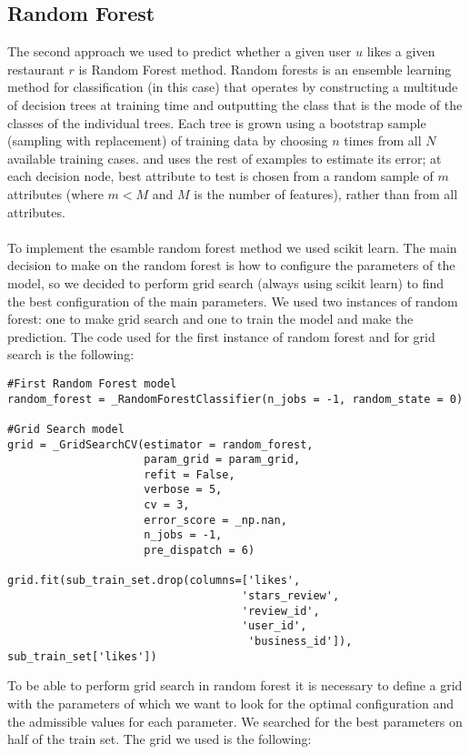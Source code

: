 \subsection{Random Forest}
The second approach we used to predict whether a given user $u$ likes a given restaurant $r$ is Random Forest method. Random forests is an ensemble learning method for classification (in this case) that operates by constructing a multitude of decision trees at training time and outputting the class that is the mode of the classes of the individual trees. Each tree is grown using a bootstrap sample (sampling with replacement) of training data by choosing $n$ times from all $N$ available training cases. and uses the rest of examples to estimate its error; at each decision node, best attribute to test is chosen from a random sample of $m$ attributes (where $m < M$ and $M$ is the number of features), rather than from all attributes.\\
\\
To implement the esamble random forest method we used scikit learn. The main decision to make on the random forest is how to configure the parameters of the model, so we decided to perform grid search (always using scikit learn) to find the best configuration of the main parameters. We used two instances of random forest: one to make grid search and one to train the model and make the prediction. The code used for the first instance of random forest and for grid search is the following:

\begin{lstlisting}
#First Random Forest model
random_forest = _RandomForestClassifier(n_jobs = -1, random_state = 0)

#Grid Search model
grid = _GridSearchCV(estimator = random_forest, 
                     param_grid = param_grid, 
                     refit = False, 
                     verbose = 5, 
                     cv = 3, 
                     error_score = _np.nan, 
                     n_jobs = -1, 
                     pre_dispatch = 6)
                     
grid.fit(sub_train_set.drop(columns=['likes', 
                                    'stars_review', 
                                    'review_id', 
                                    'user_id', 
                                     'business_id']), sub_train_set['likes'])
\end{lstlisting}
To be able to perform grid search in random forest it is necessary to define a grid with the parameters of which we want to look for the optimal configuration and the admissible values for each parameter. We searched for the best parameters on half of the train set. The grid we used is the following:

